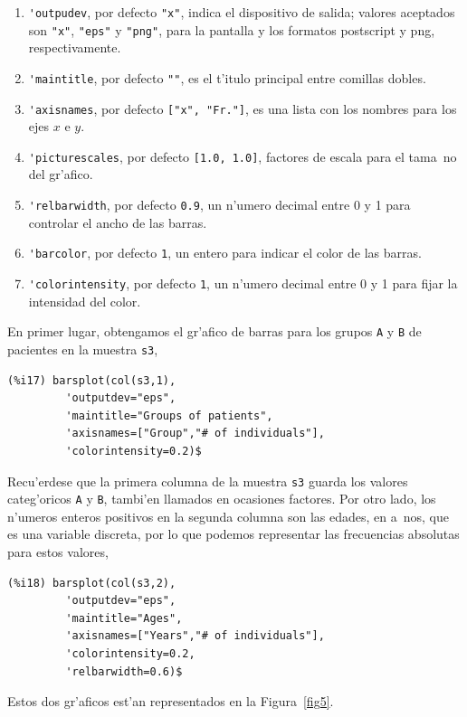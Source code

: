 \documentclass[spanish,12pt,a4paper]{article}
\begin{document}
\begin{description}
\begin{enumerate}
\item \verb|'outpudev|, por defecto \verb|"x"|, indica el dispositivo de salida; valores aceptados son \verb|"x"|, \verb|"eps"| y \verb|"png"|, para la pantalla y los formatos postscript y png, respectivamente.
\item \verb|'maintitle|, por defecto \verb|""|, es el t'itulo principal entre comillas dobles.
\item \verb|'axisnames|, por defecto \verb|["x", "Fr."]|, es una lista con los nombres para los ejes $x$ e $y$.
\item \verb|'picturescales|, por defecto \verb|[1.0, 1.0]|, factores de escala para el tama~no del gr'afico.
\item \verb|'relbarwidth|, por defecto \verb|0.9|, un n'umero decimal entre 0 y 1 para controlar el ancho de las barras.
\item \verb|'barcolor|, por defecto \verb|1|, un entero para indicar el color de las barras.
\item \verb|'colorintensity|, por defecto \verb|1|, un n'umero decimal entre 0 y 1 para fijar la intensidad del color.
\end{enumerate}

En primer lugar, obtengamos el gr'afico de barras para los grupos \verb|A| y \verb|B| de pacientes en la muestra \verb|s3|,
\begin{verbatim}
(%i17) barsplot(col(s3,1),
         'outputdev="eps",
         'maintitle="Groups of patients",
         'axisnames=["Group","# of individuals"],
         'colorintensity=0.2)$
\end{verbatim}
Recu'erdese que la primera columna de la muestra \verb|s3| guarda los valores categ'oricos \verb|A| y \verb|B|, tambi'en llamados en ocasiones factores. Por otro lado, los n'umeros enteros positivos en la segunda columna son las edades, en a~nos, que es una variable discreta, por lo que podemos representar las frecuencias absolutas para estos valores,
\begin{verbatim}
(%i18) barsplot(col(s3,2),
         'outputdev="eps",
         'maintitle="Ages",
         'axisnames=["Years","# of individuals"],
         'colorintensity=0.2,
         'relbarwidth=0.6)$
\end{verbatim}

Estos dos gr'aficos est'an representados en la Figura~\ref{fig5}.


\end{description}
\end{document}

